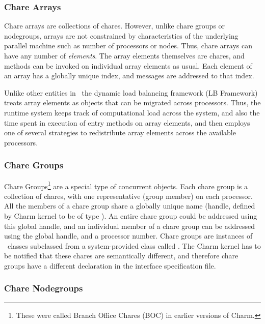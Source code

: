 \subsubsection{Chare Arrays}

Chare arrays are collections of chares. However, unlike chare groups or
nodegroups, arrays are not constrained by characteristics of the underlying
parallel machine such as number of processors or nodes. Thus, chare arrays
can have any number of {\em elements}. The array elements themselves are
chares, and methods can be invoked on individual array elements as usual.  
Each element of an array has a globally unique index, and messages are
addressed to that index.

Unlike other entities in \charmpp\, the dynamic load balancing framework (LB
Framework) treats array elements as objects that can be migrated across
processors. Thus, the runtime system keeps track of computational load
across the system, and also the time spent in execution of entry methods on
array elements, and then employs one of several strategies to redistribute
array elements across the available processors.

\subsubsection{Chare Groups}

Chare Groups\footnote{ These were called Branch Office Chares (BOC) in earlier
versions of Charm.} are a special type of concurrent objects.  Each chare group
is a collection of chares, with one representative (group member) on each
processor. All the members of a chare group share a globally unique name
(handle, defined by Charm kernel to be of type ). An entire chare
group could be addressed using this global handle, and an individual member of
a chare group can be addressed using the global handle, and a processor number.
Chare groups are instances of \CC\ classes subclassed from a system-provided
class called . The Charm kernel has to be notified that these chares
are semantically different, and therefore chare groups have a different
declaration in the interface specification file.

\subsubsection{Chare Nodegroups}

